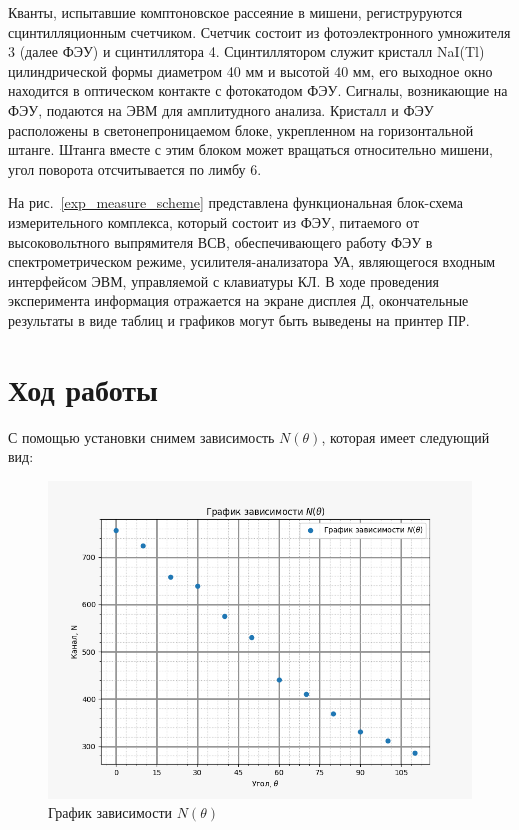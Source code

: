 	Кванты, испытавшие комптоновское рассеяние в мишени, региструруются сцинтилляционным счетчиком. Счетчик состоит из фотоэлектронного умножителя 3 (далее ФЭУ) и сцинтиллятора 4. Сцинтиллятором служит кристалл NaI(Tl) цилиндрической формы диаметром 40 мм и высотой 40 мм, его выходное окно находится в оптическом контакте с фотокатодом ФЭУ. Сигналы, возникающие на ФЭУ, подаются на ЭВМ для амплитудного анализа. Кристалл и ФЭУ расположены в светонепроницаемом блоке, укрепленном на горизонтальной штанге. Штанга вместе с этим блоком может вращаться относительно мишени, угол поворота отсчитывается по лимбу 6.
	
	На рис.~\ref{exp_measure_scheme} представлена функциональная блок-схема измерительного комплекса, который состоит из ФЭУ, питаемого от высоковольтного выпрямителя ВСВ, обеспечивающего работу ФЭУ в спектрометрическом режиме, усилителя-анализатора УА, являющегося входным интерфейсом ЭВМ, управляемой с клавиатуры КЛ. В ходе проведения эксперимента информация отражается на экране дисплея Д, окончательные результаты в виде таблиц и графиков могут быть выведены на принтер ПР.
	
\section{Ход работы}

	С помощью установки снимем зависимость $N(\theta)$, которая имеет следующий вид:

	\begin{figure}[H]
		\centering
		\includegraphics[width = 11.5 cm]{images/N_theta}
		\caption{График зависимости $N(\theta)$}
		\label{N_theta}
	\end{figure}

